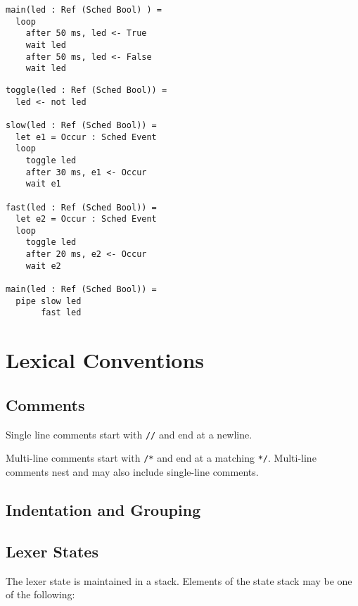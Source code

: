 \documentclass{article}
\begin{document}
\begin{lstlisting}
main(led : Ref (Sched Bool) ) =
  loop
    after 50 ms, led <- True
    wait led
    after 50 ms, led <- False
    wait led
\end{lstlisting}

\begin{lstlisting}
toggle(led : Ref (Sched Bool)) =
  led <- not led

slow(led : Ref (Sched Bool)) =
  let e1 = Occur : Sched Event
  loop
    toggle led
    after 30 ms, e1 <- Occur
    wait e1

fast(led : Ref (Sched Bool)) =
  let e2 = Occur : Sched Event
  loop
    toggle led
    after 20 ms, e2 <- Occur
    wait e2
    
main(led : Ref (Sched Bool)) =
  pipe slow led
       fast led
\end{lstlisting}

\section{Lexical Conventions}

\subsection{Comments}

Single line comments start with \lstinline!//! and end at a newline.

Multi-line comments start with \lstinline!/*! and end at a matching
\lstinline!*/!.  Multi-line comments nest and may also include
single-line comments.

\subsection{Indentation and Grouping}

\subsection{Lexer States}

The lexer state is maintained in a stack. Elements of the state stack may be one
of the following:
\end{document}
